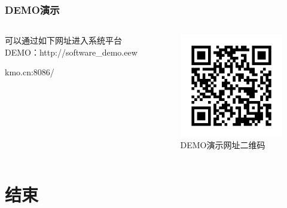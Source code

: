 \documentclass[aspectratio=43, 10pt, utf8, mathserif]{beamer}
\begin{document}
		\begin{frame}
	\frametitle{DEMO演示}
	
	\begin{columns}
		
		\begin{column}{.4\linewidth}
			可以通过如下网址进入系统平台DEMO：http://software\_demo.eew
			
			kmo.cn:8086/
		\end{column}
		
		\begin{column}{.6\linewidth}
			\begin{figure}[H]
				\centering
				\includegraphics[width=0.8\linewidth]{pic/screenshot035}
				\caption{DEMO演示网址二维码}
				\label{fig:screenshot035}
			\end{figure}
			
		\end{column}
	\end{columns}
\end{frame}



\section*{结束}

\begin{frame}
\end{frame}

\begin{frame}
\end{frame}
\end{document}

